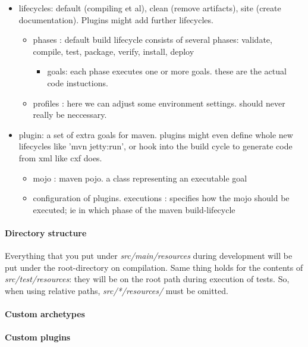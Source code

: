 \begin{itemize}
    \item lifecycles: default (compiling et al), clean (remove artifacts), site (create documentation). Plugins might add further lifecycles. 
    \begin{itemize}
        \item phases : default build lifecycle consists of several phases: validate, compile, test, package, verify, install, deploy
        \begin{itemize}
            \item goals: each phase executes one or more goals. these are the actual code instuctions. 
        \end{itemize}
        \item profiles : here we can adjust some environment settings. should never really be neccessary.
    \end{itemize}
    \item plugin: a set of extra goals for maven. plugins might even define whole new lifecycles like 'mvn jetty:run', or hook into the build cycle to generate code from xml like cxf does. 
    \begin{itemize}
        \item mojo : maven pojo. a class representing an executable goal
        \item configuration of plugins. executions : specifies how the mojo should be executed; ie in which phase of the maven build-lifecycle
    \end{itemize}
\end{itemize}

\paragraph{Directory structure}
Everything that you put under \emph{src/main/resources} during development will be put under the root-directory on compilation. Same thing holds for the contents of \emph{src/test/resources}: they will be on the root path during execution of tests. So, when using relative paths, \emph{src/*/resources/} must be omitted.


\paragraph{Custom archetypes}

\paragraph{Custom plugins}




